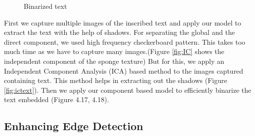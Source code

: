 \begin{figure}[p]
{}
\label{fig:res2}
\caption
{Binarized text}
\end{figure}
First we capture multiple images of the inscribed text and apply our model to extract the text with the help of shadows.
For separating the global and the direct component, we used high frequency checkerboard pattern. 
This takes too much time as we have to capture many images.(Figure \ref{fig:IC} shows
the independent component of the sponge texture)
But for this, we apply an Independent Component Analysis (ICA) based method to the images captured containing text.
This method helps in extracting out the shadows (Figure \ref{fig:ictext}). 
Then we apply our component based model to efficiently binarize the text
embedded (Figure 4.17, 4.18).

\subsection{Enhancing Edge Detection}



